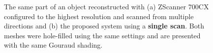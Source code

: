 \documentclass[final,12pt,3p]{elsarticle}
\begin{document}
\begin{landscape}
\begin{figure}[!ht]
	\hfill
	\caption{\label{fig:amphora} The same part of an object reconstructed with (a) ZScanner 700CX configured to the highest resolution and scanned from multiple directions and (b) the proposed system using a \textbf{single scan}. Both meshes were hole-filled using the same settings and are presented with the same Gouraud shading.}
\end{figure}
\end{landscape}
\end{document}
